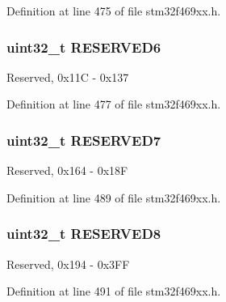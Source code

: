 Definition at line 475 of file stm32f469xx.\+h.

\subsubsection[{\texorpdfstring{R\+E\+S\+E\+R\+V\+E\+D6}{RESERVED6}}]{\setlength{\rightskip}{0pt plus 5cm}uint32\+\_\+t R\+E\+S\+E\+R\+V\+E\+D6}\hypertarget{struct_d_s_i___type_def_a9f6d0bcdc24876b7f73fdbb2ed4f8ba8}{}\label{struct_d_s_i___type_def_a9f6d0bcdc24876b7f73fdbb2ed4f8ba8}
Reserved, 0x11C -\/ 0x137 

Definition at line 477 of file stm32f469xx.\+h.

\subsubsection[{\texorpdfstring{R\+E\+S\+E\+R\+V\+E\+D7}{RESERVED7}}]{\setlength{\rightskip}{0pt plus 5cm}uint32\+\_\+t R\+E\+S\+E\+R\+V\+E\+D7}\hypertarget{struct_d_s_i___type_def_ac2f9e802040136e73422d91195ea8690}{}\label{struct_d_s_i___type_def_ac2f9e802040136e73422d91195ea8690}
Reserved, 0x164 -\/ 0x18F 

Definition at line 489 of file stm32f469xx.\+h.

\subsubsection[{\texorpdfstring{R\+E\+S\+E\+R\+V\+E\+D8}{RESERVED8}}]{\setlength{\rightskip}{0pt plus 5cm}uint32\+\_\+t R\+E\+S\+E\+R\+V\+E\+D8}\hypertarget{struct_d_s_i___type_def_a5091c517c0810731699b5c312a5e8475}{}\label{struct_d_s_i___type_def_a5091c517c0810731699b5c312a5e8475}
Reserved, 0x194 -\/ 0x3\+FF 

Definition at line 491 of file stm32f469xx.\+h.

